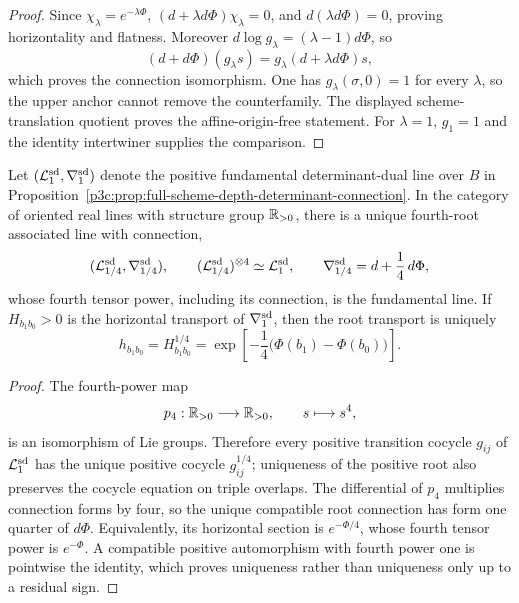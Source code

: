 \documentclass[12pt,a4paper]{article}
\begin{document}
\begin{proof}
Since $\chi_\lambda=e^{-\lambda\Phi}$,
\(
 (d+\lambda d\Phi)\chi_\lambda=0
\), and $d(\lambda d\Phi)=0$, proving horizontality and flatness.  Moreover
$d\log g_\lambda=(\lambda-1)d\Phi$, so
\[
 (d+d\Phi)(g_\lambda s)
 =g_\lambda(d+\lambda d\Phi)s,
\]
which proves the connection isomorphism.  One has
$g_\lambda(\sigma,0)=1$ for every $\lambda$, so the upper anchor cannot
remove the counterfamily.  The displayed scheme-translation quotient proves
the affine-origin-free statement.  For $\lambda=1$, $g_1=1$ and the identity
intertwiner supplies the comparison.
\end{proof}

\begin{theorem}
\label{p3c:thm:positive-associated-line-fourth-root}
Let \((\mathcal L^{\rm sd}_1,\nabla^{\rm sd}_1)\) denote the positive
fundamental determinant-dual line over \(B\) in
Proposition~\ref{p3c:prop:full-scheme-depth-determinant-connection}.  In the
category of oriented real lines with structure group \(\mathbb{R}_{>0}\), there is
a unique fourth-root associated line with connection,
\[
 (\mathcal L^{\rm sd}_{1/4},\nabla^{\rm sd}_{1/4}),
 \qquad
 (\mathcal L^{\rm sd}_{1/4})^{\otimes4}\simeq
 \mathcal L^{\rm sd}_1,
 \qquad
 \nabla^{\rm sd}_{1/4}=d+\frac14\,d\Phi,
\]
whose fourth tensor power, including its connection, is the fundamental
line.  If \(H_{b_1b_0}>0\) is the horizontal transport of
\(\nabla^{\rm sd}_1\), then the root transport is uniquely
\[
 h_{b_1b_0}=H_{b_1b_0}^{1/4}
 =\exp\!\left[-\frac14\bigl(\Phi(b_1)-\Phi(b_0)\bigr)\right].
\]
\end{theorem}

\begin{proof}
The fourth-power map
\[
 p_4:\mathbb{R}_{>0}\longrightarrow\mathbb{R}_{>0},\qquad s\longmapsto s^4,
\]
is an isomorphism of Lie groups.  Therefore every positive transition
cocycle \(g_{ij}\) of \(\mathcal L^{\rm sd}_1\) has the unique positive
cocycle \(g_{ij}^{1/4}\); uniqueness of the positive root also preserves the
cocycle equation on triple overlaps.  The differential of \(p_4\) multiplies
connection forms by four, so the unique compatible root connection has form
one quarter of \(d\Phi\).  Equivalently, its horizontal section is
\(e^{-\Phi/4}\), whose fourth tensor power is \(e^{-\Phi}\).  A compatible
positive automorphism with fourth power one is pointwise the identity, which
proves uniqueness rather than uniqueness only up to a residual sign.
\end{proof}
\end{document}
